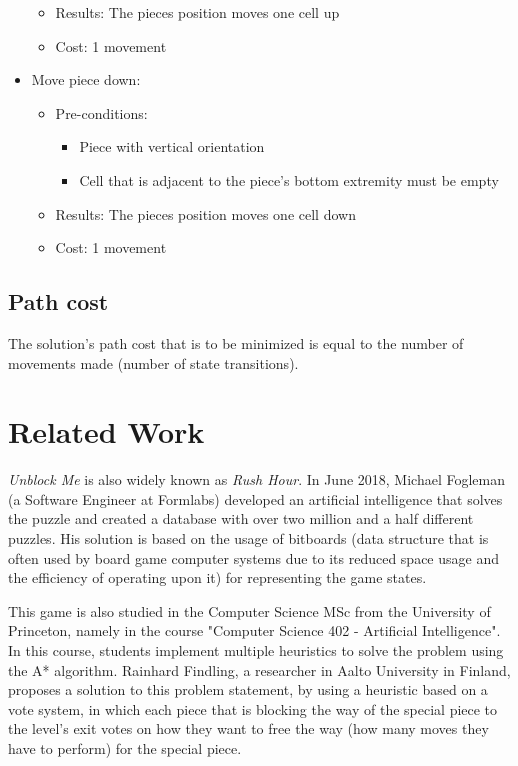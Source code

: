 \documentclass[conference]{IEEEtran}
\begin{document}
\begin{itemize}
\begin{itemize}
\begin{itemize}
        \end{itemize}
        \item Results: The pieces position moves one cell up
        \item Cost: 1 movement
    \end{itemize}
    \item Move piece down:
    \begin{itemize}
        \item Pre-conditions:
        \begin{itemize}
            \item Piece with vertical orientation
            \item Cell that is adjacent to the piece's bottom extremity must be empty
        \end{itemize}
        \item Results: The pieces position moves one cell down
        \item Cost: 1 movement
    \end{itemize}
\end{itemize}

\subsection{Path cost}
The solution's path cost that is to be minimized is equal to the number of movements made (number of state transitions).


\section{Related Work}
\textit{Unblock Me} is also widely known as \textit{Rush Hour}. In June 2018, Michael Fogleman (a Software Engineer at Formlabs) developed an artificial intelligence that solves the puzzle and created a database with over two million and a half different puzzles\cite{b2}. His solution is based on the usage of bitboards\cite{b3} (data structure that is often used by board game computer systems due to its reduced space usage and the efficiency of operating upon it) for representing the game states.

This game is also studied in the Computer Science MSc from the University of Princeton, namely in the course "Computer Science 402 - Artificial Intelligence". In this course, students implement multiple heuristics to solve the problem using the A* algorithm\cite{b4}. Rainhard Findling, a researcher in Aalto University in Finland, proposes a solution to this problem statement, by using a heuristic based on a vote system, in which each piece that is blocking the way of the special piece to the level's exit votes on how they want to free the way (how many moves they have to perform) for the special piece\cite{b5}.
\end{document}
